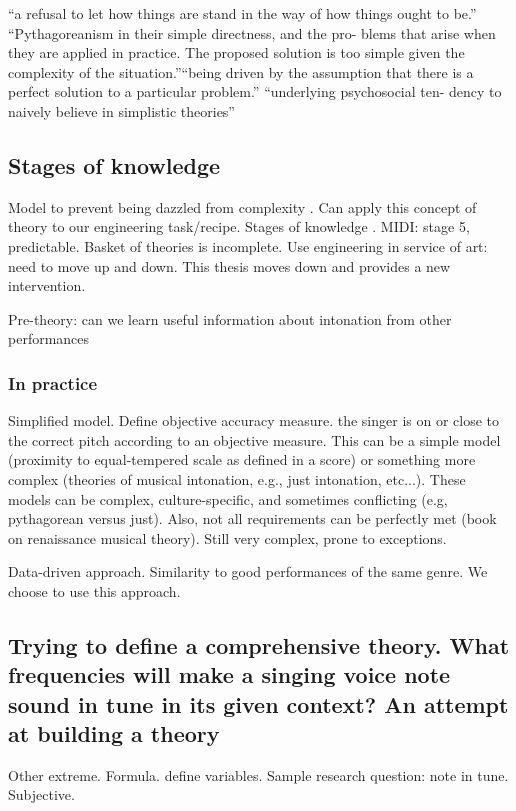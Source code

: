  ``a refusal to let how things are stand in the way of how things ought to be.'' ``Pythagoreanism in their simple directness, and the pro- blems that arise when they are applied in practice. The proposed solution is too simple given the complexity of the situation.''``being driven by the assumption that there is a perfect solution to a particular problem.'' ``underlying psychosocial ten- dency to naively believe in simplistic theories'' \cite{parncutt2018psychocultural}

\subsection{Stages of knowledge}
Model to prevent being dazzled from complexity \cite{bacharach1989organizational}. Can apply this concept of theory to our engineering task/recipe. Stages of knowledge \cite{}. MIDI: stage 5, predictable. Basket of theories is incomplete. Use engineering in service of art: need to move up and down. This thesis moves down and provides a new intervention. 

Pre-theory: can we learn useful information about intonation from other performances

\subsubsection{In practice}

Simplified model. Define objective accuracy measure. the singer is on or close to the correct pitch according to an objective measure. This can be a simple model (proximity to equal-tempered scale as defined in a score) or something more complex (theories of musical intonation, e.g., just intonation, etc...). These models can be complex, culture-specific, and sometimes conflicting (e.g, pythagorean versus just). Also, not all requirements can be perfectly met (book on renaissance musical theory). Still very complex, prone to exceptions. 

Data-driven approach. Similarity to good performances of the same genre. We choose to use this approach.

\subsection{Trying to define a comprehensive theory. What frequencies will make a singing voice note sound in tune in its given context? An attempt at building a theory}
Other extreme. Formula. define variables.
Sample research question: note in tune.
Subjective.

